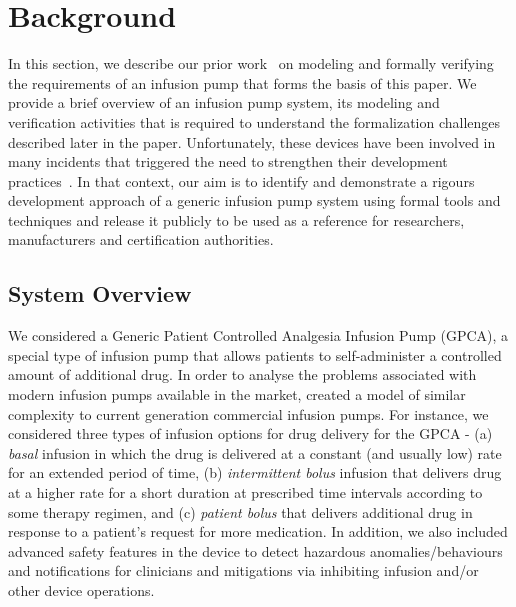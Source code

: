 \section{Background}
\label{sec:gpca-overview}

In this section, we describe our prior work~\cite{hilt2013, req2code} on modeling and formally verifying the requirements of an infusion pump that forms the basis of this paper. We provide a brief overview of an infusion pump system, its modeling and verification activities that is required to understand the formalization challenges described later in the paper. Unfortunately, these devices have been involved in many incidents that triggered the need to strengthen their development practices~\cite{fda2010whitepaper}. In that context, our aim is to identify and demonstrate a rigours development approach of a generic infusion pump system using formal tools and techniques and release it publicly to be used as a reference for researchers, manufacturers and certification authorities.

\subsection {System Overview}
We considered a Generic Patient Controlled Analgesia Infusion Pump (GPCA), a special type of infusion pump that allows patients to self-administer a controlled amount of additional drug. %
In order to analyse the problems associated with modern infusion pumps available in the market, created a model of similar complexity to current generation commercial infusion pumps. For instance, we considered three types of infusion options for drug delivery for the GPCA - (a) \emph{basal} infusion in which the drug is delivered at a constant (and usually low) rate for an extended period of
time, (b) \emph{intermittent bolus} infusion that delivers drug at a higher rate for a short duration at prescribed time intervals according to some therapy regimen, and (c) \emph{patient bolus} that delivers additional drug in response to a patient's request for more medication. In addition, we also included advanced safety features in the device to detect hazardous anomalies/behaviours and notifications for clinicians and mitigations via inhibiting infusion and/or other device operations.

